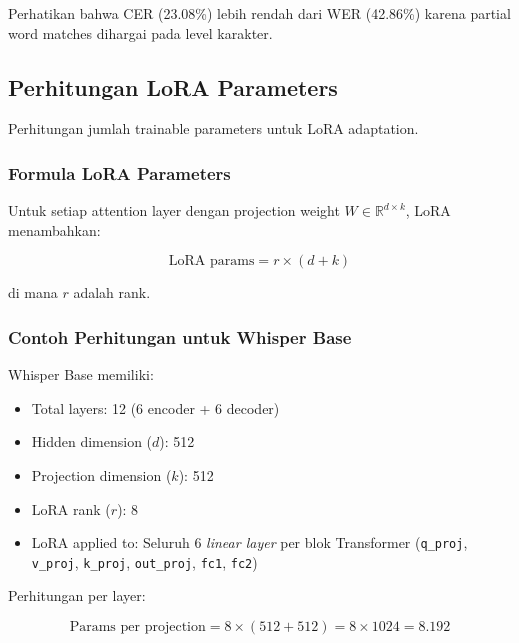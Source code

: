 \noindent
Perhatikan bahwa CER (23.08\%) lebih rendah dari WER (42.86\%) karena partial word matches dihargai pada level karakter.

\subsection{Perhitungan LoRA Parameters}
\label{III.Ilustrasi_LoRA}

Perhitungan jumlah trainable parameters untuk LoRA adaptation.

\subsubsection{Formula LoRA Parameters}

Untuk setiap attention layer dengan projection weight $W \in \mathbb{R}^{d \times k}$, LoRA menambahkan:

\vspace{0.3cm}
\begin{equation}
\label{eq:lora_params}
\text{LoRA params} = r \times (d + k)
\end{equation}
\vspace{0.2cm}

\noindent
di mana $r$ adalah rank.

\subsubsection{Contoh Perhitungan untuk Whisper Base}

Whisper Base memiliki:
\begin{itemize}[noitemsep]
    \item Total layers: 12 (6 encoder + 6 decoder)
    \item Hidden dimension ($d$): 512
    \item Projection dimension ($k$): 512
    \item LoRA rank ($r$): 8
    \item LoRA applied to: Seluruh 6 \textit{linear layer} per blok Transformer (\texttt{q\_proj}, \texttt{v\_proj}, \texttt{k\_proj}, \texttt{out\_proj}, \texttt{fc1}, \texttt{fc2})
\end{itemize}

Perhitungan per layer:

\vspace{0.3cm}
\begin{equation}
\label{eq:lora_per_projection}
\text{Params per projection} = 8 \times (512 + 512) = 8 \times 1024 = 8.192
\end{equation}
\vspace{0.2cm}

